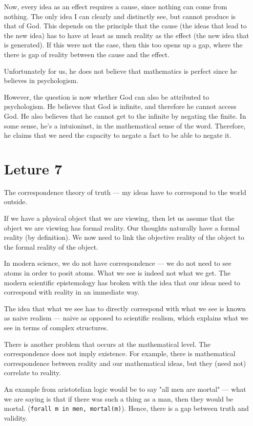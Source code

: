 \documentclass[11pt]{book}
\begin{document}
Now, every idea as an effect requires a cause, since nothing can come from
nothing. The only idea I can clearly and distinctly see, but cannot produce is
that of God. This depends on the principle that the cause (the ideas that lead
to the new idea) has to have at least as much reality as the effect (the new
idea that is generated). If this were not the case, then this too opens up a
gap, where the there is gap of reality between the cause and the effect.

Unfortunately for us, he does not believe that mathematics is perfect since he
believes in psychologism. 

However, the question is now whether God can also be attributed to
psychologism.  He believes that God is infinite, and therefore he cannot access
God. He also believes that he cannot get to the infinite by negating the
finite. In some sense, he's a intuioninst, in the mathematical sense of the
word.  Therefore, he claims that we need the capacity to negate a fact to be
able to negate it.

\section{Leture 7}

The correspondence theory of truth --- my ideas have to correspond to the
world outside.

If we have a physical object that we are viewing, then let us assume that
the object we are viewing has formal reality. Our thoughts naturally have
a formal reality (by definition). We now need to link the objective reality
of the object to the formal reality of the object.

In modern science, we do not have correspondence --- we do not need to see
atoms in order to posit atoms. What we see is indeed not what we get. The
modern scientific epistemology has broken with the idea that our ideas need to
correspond with reality in an immediate way.

The idea that what we see has to directly correspond with what we see is known
as naive realism --- naive as opposed to scientific realism, which explains what
we see in terms of complex structures.

There is another problem that occurs at the mathematical level. The correspondence
does not imply existence. For example, there is  mathematical correspondence
between reality and our mathematical ideas, but they (need not) correlate to
reality.

An example from aristotelian logic would be to say "all men are mortal" --- what
we are saying is that if there was such a thing as a man, then they would be mortal.
({\texttt{forall m in men, mortal(m)}}). Hence, there is a gap between truth
and validity.
\end{document}
